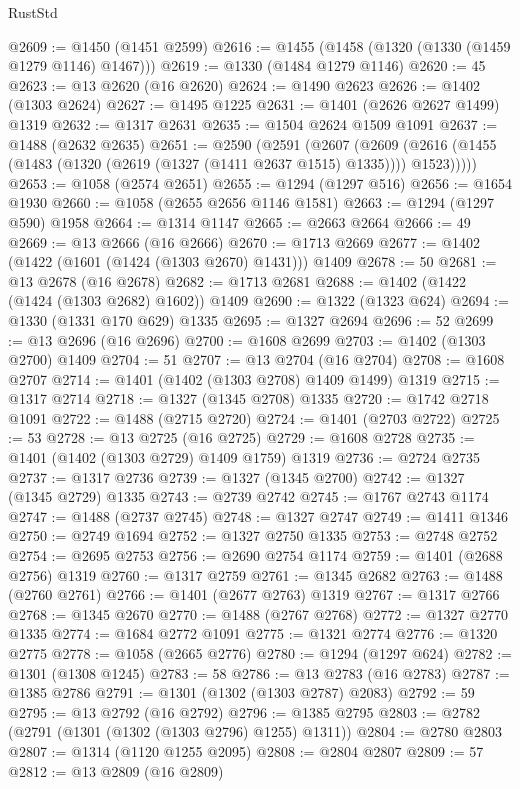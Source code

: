 \begin{lexlean}{RustStd}
\begin{coremodule}
{\begin{coremodule}
{{{{{{{{{{{{{{{{{{{{{{{{{{{{{{{{{{{{{{@2609 := @1450 (@1451 @2599)
@2616 := @1455 (@1458 (@1320 (@1330 (@1459 @1279 @1146) @1467)))
@2619 := @1330 (@1484 @1279 @1146)
@2620 := 45
@2623 := @13 @2620 (@16 @2620)
@2624 := @1490 @2623
@2626 := @1402 (@1303 @2624)
@2627 := @1495 @1225
@2631 := @1401 (@2626 @2627 @1499) @1319
@2632 := @1317 @2631
@2635 := @1504 @2624 @1509 @1091
@2637 := @1488 (@2632 @2635)
@2651 := @2590
    (@2591
      (@2607
        (@2609 (@2616 (@1455 (@1483 (@1320 (@2619 (@1327 (@1411 @2637 @1515) @1335)))) @1523)))))
@2653 := @1058 (@2574 @2651)
@2655 := @1294 (@1297 @516)
@2656 := @1654 @1930
@2660 := @1058 (@2655 @2656 @1146 @1581)
@2663 := @1294 (@1297 @590) @1958
@2664 := @1314 @1147
@2665 := @2663 @2664
@2666 := 49
@2669 := @13 @2666 (@16 @2666)
@2670 := @1713 @2669
@2677 := @1402 (@1422 (@1601 (@1424 (@1303 @2670) @1431))) @1409
@2678 := 50
@2681 := @13 @2678 (@16 @2678)
@2682 := @1713 @2681
@2688 := @1402 (@1422 (@1424 (@1303 @2682) @1602)) @1409
@2690 := @1322 (@1323 @624)
@2694 := @1330 (@1331 @170 @629) @1335
@2695 := @1327 @2694
@2696 := 52
@2699 := @13 @2696 (@16 @2696)
@2700 := @1608 @2699
@2703 := @1402 (@1303 @2700) @1409
@2704 := 51
@2707 := @13 @2704 (@16 @2704)
@2708 := @1608 @2707
@2714 := @1401 (@1402 (@1303 @2708) @1409 @1499) @1319
@2715 := @1317 @2714
@2718 := @1327 (@1345 @2708) @1335
@2720 := @1742 @2718 @1091
@2722 := @1488 (@2715 @2720)
@2724 := @1401 (@2703 @2722)
@2725 := 53
@2728 := @13 @2725 (@16 @2725)
@2729 := @1608 @2728
@2735 := @1401 (@1402 (@1303 @2729) @1409 @1759) @1319
@2736 := @2724 @2735
@2737 := @1317 @2736
@2739 := @1327 (@1345 @2700)
@2742 := @1327 (@1345 @2729) @1335
@2743 := @2739 @2742
@2745 := @1767 @2743 @1174
@2747 := @1488 (@2737 @2745)
@2748 := @1327 @2747
@2749 := @1411 @1346
@2750 := @2749 @1694
@2752 := @1327 @2750 @1335
@2753 := @2748 @2752
@2754 := @2695 @2753
@2756 := @2690 @2754 @1174
@2759 := @1401 (@2688 @2756) @1319
@2760 := @1317 @2759
@2761 := @1345 @2682
@2763 := @1488 (@2760 @2761)
@2766 := @1401 (@2677 @2763) @1319
@2767 := @1317 @2766
@2768 := @1345 @2670
@2770 := @1488 (@2767 @2768)
@2772 := @1327 @2770 @1335
@2774 := @1684 @2772 @1091
@2775 := @1321 @2774
@2776 := @1320 @2775
@2778 := @1058 (@2665 @2776)
@2780 := @1294 (@1297 @624)
@2782 := @1301 (@1308 @1245)
@2783 := 58
@2786 := @13 @2783 (@16 @2783)
@2787 := @1385 @2786
@2791 := @1301 (@1302 (@1303 @2787) @2083)
@2792 := 59
@2795 := @13 @2792 (@16 @2792)
@2796 := @1385 @2795
@2803 := @2782 (@2791 (@1301 (@1302 (@1303 @2796) @1255) @1311))
@2804 := @2780 @2803
@2807 := @1314 (@1120 @1255 @2095)
@2808 := @2804 @2807
@2809 := 57
@2812 := @13 @2809 (@16 @2809)
}}}}}}}}}}}}}}}}}}}}}}}}}}}}}}}}}}}}}}
\end{coremodule}}
\end{coremodule}
\end{lexlean}
